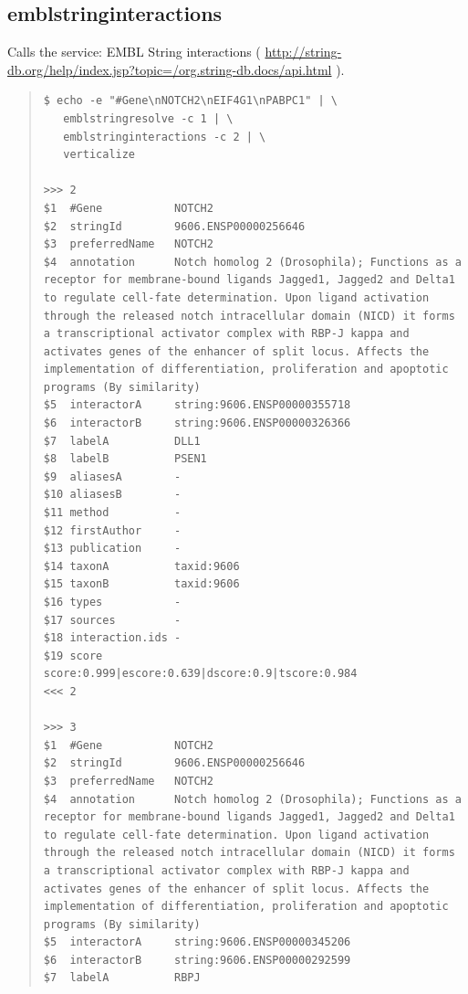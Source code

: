 \documentclass[12pt]{article}
\begin{document}
\subsection{emblstringinteractions}
Calls the service: EMBL String interactions ( \url{http://string-db.org/help/index.jsp?topic=/org.string-db.docs/api.html} ).
\begin{quote}
\begin{verbatim}
$ echo -e "#Gene\nNOTCH2\nEIF4G1\nPABPC1" | \
   emblstringresolve -c 1 | \
   emblstringinteractions -c 2 | \
   verticalize 
   
>>>	2
$1	#Gene          	NOTCH2
$2	stringId       	9606.ENSP00000256646
$3	preferredName  	NOTCH2
$4	annotation     	Notch homolog 2 (Drosophila); Functions as a receptor for membrane-bound ligands Jagged1, Jagged2 and Delta1 to regulate cell-fate determination. Upon ligand activation through the released notch intracellular domain (NICD) it forms a transcriptional activator complex with RBP-J kappa and activates genes of the enhancer of split locus. Affects the implementation of differentiation, proliferation and apoptotic programs (By similarity)
$5	interactorA    	string:9606.ENSP00000355718
$6	interactorB    	string:9606.ENSP00000326366
$7	labelA         	DLL1
$8	labelB         	PSEN1
$9	aliasesA       	-
$10	aliasesB       	-
$11	method         	-
$12	firstAuthor    	-
$13	publication    	-
$14	taxonA         	taxid:9606
$15	taxonB         	taxid:9606
$16	types          	-
$17	sources        	-
$18	interaction.ids	-
$19	score          	score:0.999|escore:0.639|dscore:0.9|tscore:0.984
<<<	2

>>>	3
$1	#Gene          	NOTCH2
$2	stringId       	9606.ENSP00000256646
$3	preferredName  	NOTCH2
$4	annotation     	Notch homolog 2 (Drosophila); Functions as a receptor for membrane-bound ligands Jagged1, Jagged2 and Delta1 to regulate cell-fate determination. Upon ligand activation through the released notch intracellular domain (NICD) it forms a transcriptional activator complex with RBP-J kappa and activates genes of the enhancer of split locus. Affects the implementation of differentiation, proliferation and apoptotic programs (By similarity)
$5	interactorA    	string:9606.ENSP00000345206
$6	interactorB    	string:9606.ENSP00000292599
$7	labelA         	RBPJ

\end{verbatim}
\end{quote}
\end{document}
